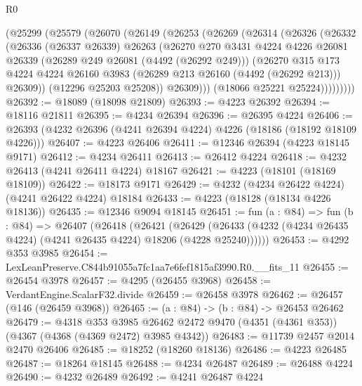 \begin{lexlean}{R0}
\begin{coremodule}
        (@25299
          (@25579
            (@26070
              (@26149
                (@26253
                  (@26269
                    (@26314
                      (@26326
                        (@26332
                          (@26336
                            (@26337 @26339)
                            @26263
                            (@26270
                              @270
                              @3431
                              @4224
                              @4226
                              @26081
                              @26339
                              (@26289 @249 @26081 (@4492 (@26292 @249)))
                              (@26270
                                @315
                                @173
                                @4224
                                @4224
                                @26160
                                @3983
                                (@26289 @213 @26160 (@4492 (@26292 @213)))
                                @26309))
                            (@12296 @25203 @25208))
                          @26309)))
                    (@18066 @25221 @25224)))))))))
@26392 := @18089 (@18098 @21809)
@26393 := @4223 @26392
@26394 := @18116 @21811
@26395 := @4234 @26394
@26396 := @26395 @4224
@26406 := @26393 (@4232 @26396 (@4241 @26394 @4224) @4226 (@18186 (@18192 @18109 @4226)))
@26407 := @4223 @26406
@26411 := @12346 @26394 (@4223 @18145 @9171)
@26412 := @4234 @26411
@26413 := @26412 @4224
@26418 := @4232 @26413 (@4241 @26411 @4224) @18167
@26421 := @4223 (@18101 (@18169 @18109))
@26422 := @18173 @9171
@26429 := @4232 (@4234 @26422 @4224) (@4241 @26422 @4224) @18184
@26433 := @4223 (@18128 (@18134 @4226 @18136))
@26435 := @12346 @9094 @18145
@26451 := fun (a : @84) =>
  fun (b : @84) =>
  @26407
    (@26418
      (@26421
        (@26429 (@26433 (@4232 (@4234 @26435 @4224) (@4241 @26435 @4224) @18206 (@4228 @25240))))))
@26453 := @4292 @353 @3985
@26454 := LexLeanPreserve.C844b91055a7fc1aa7e6fef1815af3990.R0.__fits_11
@26455 := @26454 @3978
@26457 := @4295 (@26455 @3968)
@26458 := VerdantEngine.ScalarF32.divide
@26459 := @26458 @3978
@26462 := @26457 (@146 (@26459 @3968))
@26465 := (a : @84) -> (b : @84) -> @26453 @26462
@26479 := @4318
    @353
    @3985
    @26462
    @2472
    @9470
    (@4351 (@4361 @353))
    (@4367 (@4368 (@4369 @2472) @3985 @4342))
@26483 := @11739 @2457 @2014 @2470 @26406
@26485 := @18252 (@18260 @18136)
@26486 := @4223 @26485
@26487 := @18264 @18145
@26488 := @4234 @26487
@26489 := @26488 @4224
@26490 := @4232 @26489
@26492 := @4241 @26487 @4224

\end{coremodule}
\end{lexlean}
